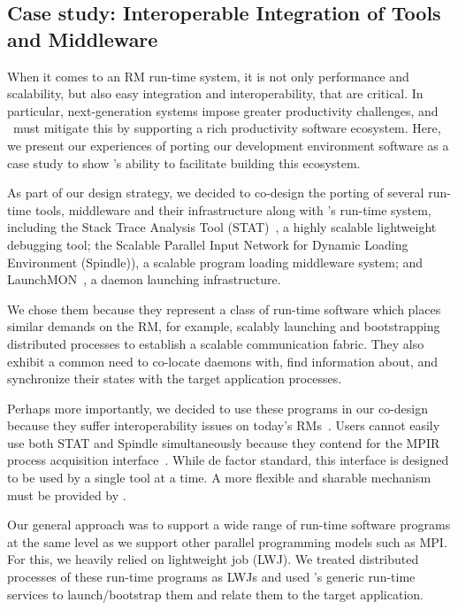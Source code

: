 \subsection{Case study: Interoperable Integration of Tools and Middleware}
\label{case}
When it comes to an RM run-time system, it is 
not only performance and scalability,
but also easy integration and interoperability, that are critical.
In particular, next-generation systems impose greater productivity
challenges, and \flux\ must mitigate this by supporting a rich 
productivity software ecosystem. 
Here, we present our experiences of porting our development
environment software as a case study
to show \flux's ability to facilitate building this ecosystem. 

As part of our design strategy, we decided to 
co-design the porting of several run-time tools, middleware 
and their infrastructure along with \flux's run-time system,
including the Stack Trace Analysis Tool (STAT)~\cite{STAT},
a highly scalable lightweight debugging tool;
the Scalable Parallel Input Network for Dynamic Loading
Environment ({\sc Spindle})),
a scalable program loading middleware system;
and LaunchMON~\cite{launchmon}, a daemon launching infrastructure.

We chose them because they represent a class of run-time
software which places similar demands on the RM,
for example, scalably launching and bootstrapping
distributed processes to establish a scalable 
communication fabric.
They also exhibit a common need to co-locate daemons with, 
find information about, and synchronize their states with 
the target application processes.

Perhaps more importantly, we decided to use these programs
in our co-design because they suffer interoperability issues on 
today's RMs~\cite{Jette02slurm,ALPS,BGQRes,Castain05theopen}.
Users cannot easily use both STAT
and {\sc Spindle} simultaneously because they contend for
the MPIR process acquisition interface~\cite{MPIRInterface}.
While de factor standard, this interface is designed 
to be used by a single tool at a time. 
A more flexible and sharable mechanism must be provided by \flux.

Our general approach was to support a wide range of run-time software programs 
at the same level as we support other parallel programming 
models such as MPI. For this, we heavily relied on lightweight 
job (LWJ). We treated 
distributed processes of these run-time programs
as LWJs and used \flux's 
generic run-time services to launch/bootstrap them and 
relate them to the target application.%

